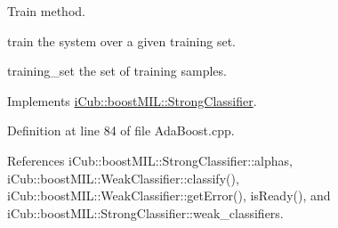 Train method. 

train the system over a given training set.

training\+\_\+set the set of training samples. 

Implements \hyperlink{classiCub_1_1boostMIL_1_1StrongClassifier_a9d593cc5db61f2c615a510e8027d2b47}{i\+Cub\+::boost\+M\+I\+L\+::\+Strong\+Classifier}.



Definition at line 84 of file Ada\+Boost.\+cpp.



References i\+Cub\+::boost\+M\+I\+L\+::\+Strong\+Classifier\+::alphas, i\+Cub\+::boost\+M\+I\+L\+::\+Weak\+Classifier\+::classify(), i\+Cub\+::boost\+M\+I\+L\+::\+Weak\+Classifier\+::get\+Error(), is\+Ready(), and i\+Cub\+::boost\+M\+I\+L\+::\+Strong\+Classifier\+::weak\+\_\+classifiers.


